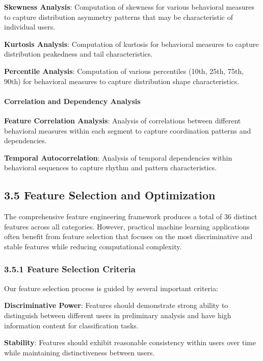 \documentclass[
  11pt,
  a4paper,
]{article}
\begin{document}
\textbf{Skewness Analysis}: Computation of skewness for various
behavioral measures to capture distribution asymmetry patterns that may
be characteristic of individual users.

\textbf{Kurtosis Analysis}: Computation of kurtosis for behavioral
measures to capture distribution peakedness and tail characteristics.

\textbf{Percentile Analysis}: Computation of various percentiles (10th,
25th, 75th, 90th) for behavioral measures to capture distribution shape
characteristics.

\paragraph{Correlation and Dependency
Analysis}\label{correlation-and-dependency-analysis}

\textbf{Feature Correlation Analysis}: Analysis of correlations between
different behavioral measures within each segment to capture
coordination patterns and dependencies.

\textbf{Temporal Autocorrelation}: Analysis of temporal dependencies
within behavioral sequences to capture rhythm and pattern
characteristics.

\subsection{3.5 Feature Selection and
Optimization}\label{feature-selection-and-optimization}

The comprehensive feature engineering framework produces a total of 36
distinct features across all categories. However, practical machine
learning applications often benefit from feature selection that focuses
on the most discriminative and stable features while reducing
computational complexity.

\subsubsection{3.5.1 Feature Selection
Criteria}\label{feature-selection-criteria}

Our feature selection process is guided by several important criteria:

\textbf{Discriminative Power}: Features should demonstrate strong
ability to distinguish between different users in preliminary analysis
and have high information content for classification tasks.

\textbf{Stability}: Features should exhibit reasonable consistency
within users over time while maintaining distinctiveness between users.
\end{document}

